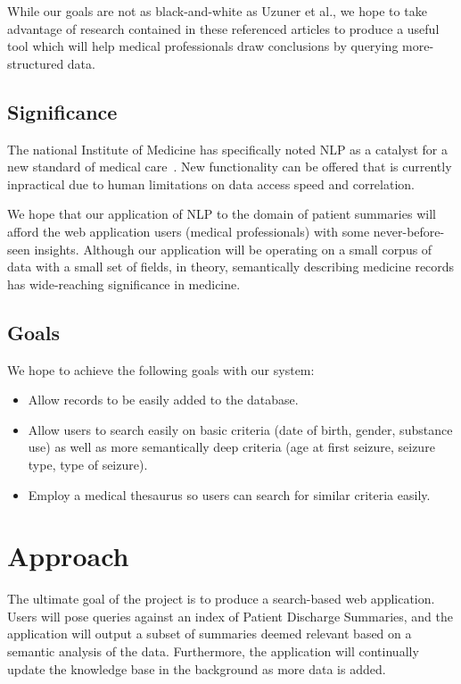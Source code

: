 \documentclass[12pt]{article}
\begin{document}
While our goals are not as black-and-white as Uzuner et al., we hope to take advantage of
research contained in these referenced articles to produce a useful tool which will
help medical professionals draw conclusions by querying more-structured data.

\subsection{Significance}
The national Institute of Medicine has specifically noted NLP as a catalyst for a new
standard of medical care~\cite{friedman}. New functionality can be offered that is currently
inpractical due to human limitations on data access speed and correlation.

We hope that our application of NLP to the domain of patient summaries will afford the
web application users (medical professionals) with some never-before-seen insights.
Although our application will be operating on a small corpus of data with a small set 
of fields, in theory, semantically describing medicine records has wide-reaching 
significance in medicine.

\subsection{Goals}
We hope to achieve the following goals with our system:
\begin{itemize}
	\item Allow records to be easily added to the database.
	\item Allow users to search easily on basic criteria (date of birth, gender,
substance use) as well as more semantically deep criteria (age at first seizure,
seizure type, type of seizure).
	\item Employ a medical thesaurus so users can search for similar criteria easily.
\end{itemize}

\section{Approach}
The ultimate goal of the project is to produce a search-based web application.
Users will pose queries against an index of Patient Discharge Summaries, and the
application will output a subset of summaries deemed relevant based on a semantic
analysis of the data. Furthermore, the application will continually update the
knowledge base in the background as more data is added.
\end{document}
